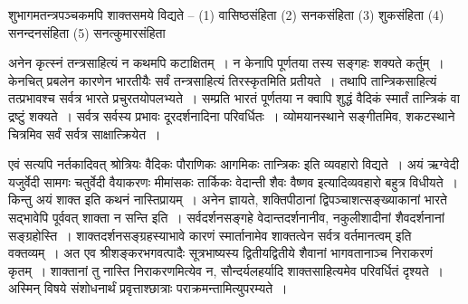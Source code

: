 {शुभागमतन्त्रपञ्चकमपि शाक्तसमये विद्यते – (1) वासिष्ठसंहिता (2) सनकसंहिता (3) शुकसंहिता (4) सनन्दनसंहिता (5) सनत्कुमारसंहिता

अनेन कृत्स्नं तन्त्रसाहित्यं न कथमपि कटाक्षितम्~। न केनापि पूर्णतया तस्य सङ्गहः शक्यते कर्तुम्~। केनचित् प्रबलेन कारणेन भारतीयैः सर्वं तन्त्रसाहित्यं तिरस्कृतमिति प्रतीयते~। तथापि तान्त्रिकसाहित्यं तत्प्रभावश्च सर्वत्र भारते प्रचुरतयोपलभ्यते~। सम्प्रति भारतं पूर्णतया न क्वापि शुद्धं वैदिकं स्मार्तं तान्त्रिकं वा द्रष्टुं शक्यते~। सर्वत्र सर्वस्य प्रभावः दूरदर्शनादिना परिवर्धितः~। व्योमयानस्थाने सङ्गीतमिव, शकटस्थाने चित्रमिव सर्वं सर्वत्र साक्षात्क्रियेत~। 

एवं सत्यपि नर्तकादिवत् श्रोत्रियः वैदिकः पौराणिकः आगमिकः तान्त्रिकः इति व्यवहारो विद्यते~। अयं ऋग्वेदी यजुर्वेदी सामगः चतुर्वेदी वैयाकरणः मीमांसकः तार्किकः वेदान्ती शैवः वैष्णव इत्यादिव्यवहारो बहुत्र विधीयते~। किन्तु अयं शाक्त इति कथनं नास्तिप्रायम्~। अनेन ज्ञायते, शक्तिपीठानां द्विपञ्चाशत्सङ्ख्याकानां भारते सद्भावेपि पूर्ववत् शाक्ता न सन्ति इति~। सर्वदर्शनसङ्गहे वेदान्तदर्शनानीव, नकुलीशादीनां शैवदर्शनानां सङ्ग्रहोस्ति~। शाक्तदर्शनसङ्ग्रहस्याभावे कारणं स्मार्तानामेव शाक्तत्वेन सर्वत्र वर्तमानत्वम् इति वक्तव्यम्~। अत एव श्रीशङ्करभगवत्पादैः सूत्रभाष्यस्य द्वितीयद्वितीये शैवानां भागवतानाञ्च निराकरणं कृतम्~। शाक्तानां तु नास्ति निराकरणमित्येव न, सौन्दर्यलहर्यादि शाक्तसाहित्यमेव परिवर्धितं दृश्यते~। अस्मिन् विषये  संशोधनार्थं प्रवृत्ताश्छात्राः पराक्रमन्तामित्युपरम्यते~। 

\articleend
}
